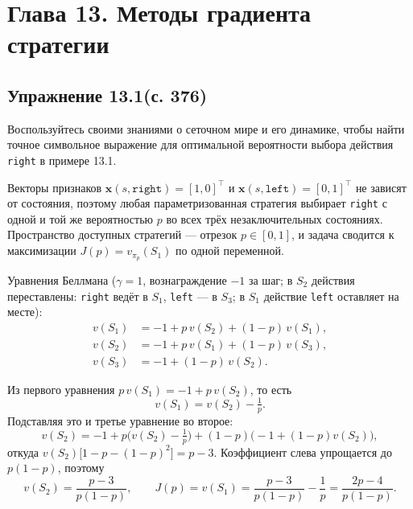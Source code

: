 \section{Глава 13. Методы градиента стратегии}

\subsection{Упражнение 13.1(с. 376)}
Воспользуйтесь своими знаниями о сеточном мире и его динамике, чтобы найти точное
символьное выражение для оптимальной вероятности выбора действия \texttt{right} в
примере 13.1.

\begin{solution}
    Векторы признаков $\mathbf x(s,\texttt{right})=[1,0]^\top$ и
    $\mathbf x(s,\texttt{left})=[0,1]^\top$ не зависят от состояния, поэтому любая
    параметризованная стратегия выбирает \texttt{right} с одной и той же
    вероятностью $p$ во всех трёх незаключительных состояниях. Пространство
    доступных стратегий --- отрезок $p\in[0,1]$, и задача сводится к максимизации
    $J(p)=v_{\pi_p}(S_1)$ по одной переменной.

    Уравнения Беллмана ($\gamma=1$, вознаграждение $-1$ за шаг; в $S_2$ действия
    переставлены: \texttt{right} ведёт в $S_1$, \texttt{left} --- в $S_3$; в $S_1$
    действие \texttt{left} оставляет на месте):
    \begin{align*}
        v(S_1) &= -1 + p\,v(S_2) + (1-p)\,v(S_1),\\
        v(S_2) &= -1 + p\,v(S_1) + (1-p)\,v(S_3),\\
        v(S_3) &= -1 + (1-p)\,v(S_2).
    \end{align*}

    Из первого уравнения $p\,v(S_1) = -1 + p\,v(S_2)$, то есть
    \begin{equation*}
        v(S_1) = v(S_2) - \tfrac1p.
    \end{equation*}
    Подставляя это и третье уравнение во второе:
    \begin{equation*}
        v(S_2) = -1 + p\Big(v(S_2)-\tfrac1p\Big) + (1-p)\big(-1+(1-p)v(S_2)\big),
    \end{equation*}
    откуда $v(S_2)\big[1-p-(1-p)^2\big] = p-3$. Коэффициент слева упрощается до
    $p(1-p)$, поэтому
    \begin{equation*}
        v(S_2) = \frac{p-3}{p(1-p)},
        \qquad
        J(p) = v(S_1) = \frac{p-3}{p(1-p)} - \frac1p = \frac{2p-4}{p(1-p)}.
    \end{equation*}


\end{solution}
